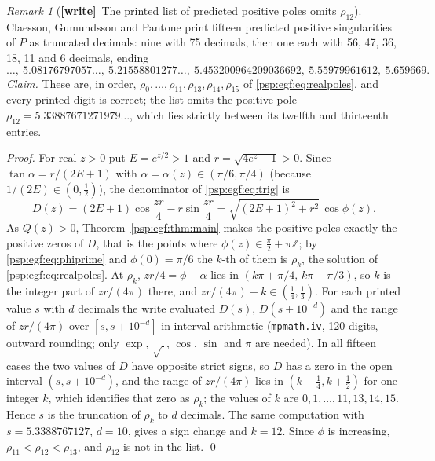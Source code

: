 \documentclass[11pt,letterpaper]{article}
\numberwithin{equation}{section}
\theoremstyle{remark}\newtheorem{remark}[theorem]{Remark}
\newcommand{\wtag}{\textup{\textbf{[write]}}}
\begin{document}
\begin{remark}[\wtag\ The printed list of predicted positive poles omits $\rho_{12}$]\label{psp:egf:rem:cgp-poles}
Claesson, Gu\dh mundsson and Pantone \cite[Section~3.3, p.~10]{cgp} print fifteen predicted positive singularities of $P$ as truncated decimals: nine with 75 decimals, then one each with 56, 47, 36, 18, 11 and 6 decimals, ending
\[
 \ldots,\ 5.08176797057\ldots,\ 5.21558801277\ldots,\ 5.453200964209036692,\ 5.55979961612,\ 5.659669 .
\]
\emph{Claim.} These are, in order, $\rho_0,\dots,\rho_{11},\rho_{13},\rho_{14},\rho_{15}$ of \eqref{psp:egf:eq:realpoles}, and every printed digit is correct; the list omits the positive pole $\rho_{12}=5.33887671271979\ldots$, which lies strictly between its twelfth and thirteenth entries.

\emph{Proof.} For real $z>0$ put $E=e^{z/2}>1$ and $r=\sqrt{4e^z-1}>0$. Since $\tan\alpha=r/(2E+1)$ with $\alpha=\alpha(z)\in(\pi/6,\pi/4)$ (because $1/(2E)\in(0,\frac12)$), the denominator of \eqref{psp:egf:eq:trig} is
\[
 D(z)=(2E+1)\cos\frac{zr}4-r\sin\frac{zr}4=\sqrt{(2E+1)^2+r^2}\,\cos\phi(z).
\]
As $Q(z)>0$, Theorem~\ref{psp:egf:thm:main} makes the positive poles exactly the positive zeros of $D$, that is the points where $\phi(z)\in\frac\pi2+\pi\mathbb Z$; by \eqref{psp:egf:eq:phiprime} and $\phi(0)=\pi/6$ the $k$-th of them is $\rho_k$, the solution of \eqref{psp:egf:eq:realpoles}. At $\rho_k$, $zr/4=\phi-\alpha$ lies in $(k\pi+\pi/4,\,k\pi+\pi/3)$, so $k$ is the integer part of $zr/(4\pi)$ there, and $zr/(4\pi)-k\in(\frac14,\frac13)$. For each printed value $s$ with $d$ decimals the write evaluated $D(s)$, $D(s+10^{-d})$ and the range of $zr/(4\pi)$ over $[s,s+10^{-d}]$ in interval arithmetic (\texttt{mpmath.iv}, 120 digits, outward rounding; only $\exp$, $\sqrt{\ }$, $\cos$, $\sin$ and $\pi$ are needed). In all fifteen cases the two values of $D$ have opposite strict signs, so $D$ has a zero in the open interval $(s,s+10^{-d})$, and the range of $zr/(4\pi)$ lies in $(k+\frac14,k+\frac12)$ for one integer $k$, which identifies that zero as $\rho_k$; the values of $k$ are $0,1,\dots,11,13,14,15$. Hence $s$ is the truncation of $\rho_k$ to $d$ decimals. The same computation with $s=5.3388767127$, $d=10$, gives a sign change and $k=12$. Since $\phi$ is increasing, $\rho_{11}<\rho_{12}<\rho_{13}$, and $\rho_{12}$ is not in the list. \qed


\end{remark}
\end{document}
